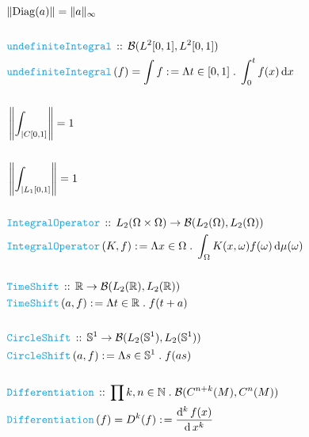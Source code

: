 \documentclass[12pt]{scrartcl}
\newcommand{\FUNC}[1]{\textcolor{Cerulean}{\mathtt{#1}}}
\renewcommand{\.}{\; . \;}
\newcommand{\de}{: \kern 0.1pc =}
\newcommand{\Act}[1]{\left( #1 \right)}
\newcommand{\DeclareFunc}[2]{& \FUNC{#1} \, :: \, #2 \\}
\newcommand{\DefineFunc}[3]{&  \FUNC{#1}\Act{#2} \de #3 \\}
\newcommand{\DefineNamedFunc}[4]{&  \FUNC{#1}\Act{#2} = #3 \de #4 \\}
\newcommand{\Page}[1]{\begin{align*} #1 \end{align*} \newpage   }
\newcommand{\Reals}{\mathbb{R} }
\newcommand{\Nat}{\mathbb{N} }
\newcommand{\Sphere}{\mathbb{S}}
\renewcommand{\O}{\Omega}
\newcommand{\B}{\mathcal{B}}
\begin{document}
 \Page{
    & \| \mathrm{Diag}(a)  \| = \| a \|_{\infty}
    \\ \\
    \DeclareFunc{undefiniteIntegral}{  \B(L^2[0,1], L^2[0,1]) }
    \DefineNamedFunc{undefiniteIntegral}{f}{ \int f}{ \Lambda t \in [0,1] \. \int^t_0 f(x) \,
    \mathrm{d}x}
    \\
    & \left \| \int_{| C[0,1]}  \right \| = 1 \\
    \\
    &  \left \| \int_{| L_1[0,1]}  \right\| = 1 \\
    \\
    \DeclareFunc{IntegralOperator}{ L_2(\O \times \O) \to \B(L_2(\O),L_2(\O)) }
    \DefineFunc{IntegralOperator}{ K,f }{ \Lambda x \in \O \. \int_\O K(x,\omega)f(\omega) \, \mathrm{d} \mu (\omega)}
    \\
   \DeclareFunc{TimeShift}{ \Reals \to \B(L_2(\Reals),L_2(\Reals)) }
   \DefineFunc{TimeShift}{ a,f }{\Lambda t \in \Reals \. f( t + a)}
   \\
   \DeclareFunc{CircleShift}{\Sphere^1 \to \B(L_2(\Sphere^1),L_2(\Sphere^1))}
   \DefineFunc{CircleShift}{ a,f }{\Lambda s \in \Sphere^1 \. f( as)}
   \\
   \DeclareFunc{Differentiation}{ \prod k,n \in \Nat \. \B(C^{n + k}(M), C^{n}(M)) }
   \DefineNamedFunc{Differentiation}{f}{D^k(f)}{\frac{ \mathrm{d}^k \, f(x)}{\mathrm{d} \, x^k}}
 }
\end{document}
